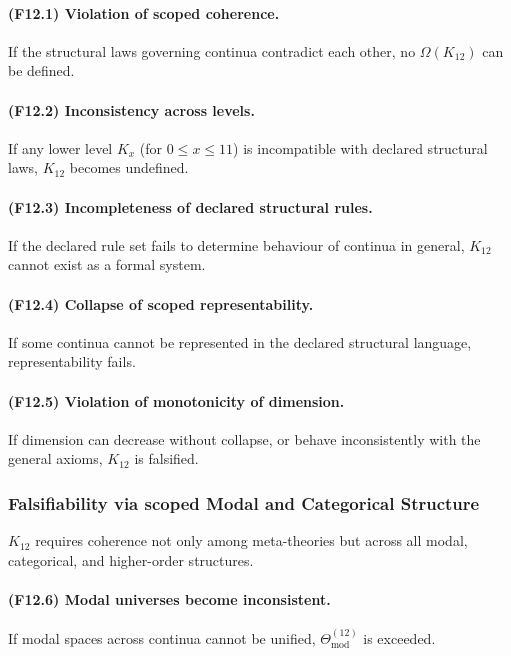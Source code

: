 \paragraph{(F12.1) Violation of scoped coherence.}
If the structural laws governing continua contradict each other,
no $\Omega(K_{12})$ can be defined.

\paragraph{(F12.2) Inconsistency across levels.}
If any lower level $K_x$ (for $0 \le x \le 11$) is incompatible with
declared structural laws, $K_{12}$ becomes undefined.

\paragraph{(F12.3) Incompleteness of declared structural rules.}
If the declared rule set fails to determine behaviour of continua
in general, $K_{12}$ cannot exist as a formal system.

\paragraph{(F12.4) Collapse of scoped representability.}
If some continua cannot be represented in the declared structural
language, representability fails.

\paragraph{(F12.5) Violation of monotonicity of dimension.}
If dimension can decrease without collapse, or behave inconsistently
with the general axioms, $K_{12}$ is falsified.



\subsubsection{Falsifiability via scoped Modal and Categorical Structure}

$K_{12}$ requires coherence not only among meta-theories but across all
modal, categorical, and higher-order structures.

\paragraph{(F12.6) Modal universes become inconsistent.}
If modal spaces across continua cannot be unified,
$\Theta_{\mathrm{mod}}^{(12)}$ is exceeded.

